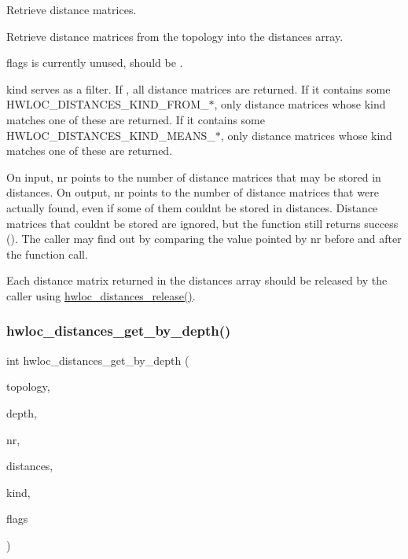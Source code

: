 Retrieve distance matrices. 

Retrieve distance matrices from the topology into the {\ttfamily distances} array.

{\ttfamily flags} is currently unused, should be {}.

{\ttfamily kind} serves as a filter. If {}, all distance matrices are returned. If it contains some H\+W\+L\+O\+C\+\_\+\+D\+I\+S\+T\+A\+N\+C\+E\+S\+\_\+\+K\+I\+N\+D\+\_\+\+F\+R\+O\+M\+\_\+$\ast$, only distance matrices whose kind matches one of these are returned. If it contains some H\+W\+L\+O\+C\+\_\+\+D\+I\+S\+T\+A\+N\+C\+E\+S\+\_\+\+K\+I\+N\+D\+\_\+\+M\+E\+A\+N\+S\+\_\+$\ast$, only distance matrices whose kind matches one of these are returned.

On input, {\ttfamily nr} points to the number of distance matrices that may be stored in {\ttfamily distances}. On output, {\ttfamily nr} points to the number of distance matrices that were actually found, even if some of them couldn\textquotesingle{}t be stored in {\ttfamily distances}. Distance matrices that couldn\textquotesingle{}t be stored are ignored, but the function still returns success ({}). The caller may find out by comparing the value pointed by {\ttfamily nr} before and after the function call.

Each distance matrix returned in the {\ttfamily distances} array should be released by the caller using \hyperlink{a00208_ga1dd78c1f9acd54f26aba0e284e97e51d}{hwloc\+\_\+distances\+\_\+release()}. \mbox{\label{a00208_ga5d1d35eccfcc2ebcef71a10972ce9b03}} 
\subsubsection{\texorpdfstring{hwloc\+\_\+distances\+\_\+get\+\_\+by\+\_\+depth()}{hwloc\_distances\_get\_by\_depth()}}
{\footnotesize\ttfamily int hwloc\+\_\+distances\+\_\+get\+\_\+by\+\_\+depth (\begin{DoxyParamCaption}\item[{\hyperlink{a00186_ga9d1e76ee15a7dee158b786c30b6a6e38}{hwloc\+\_\+topology\+\_\+t}}]{topology,  }\item[{int}]{depth,  }\item[{unsigned $\ast$}]{nr,  }\item[{struct \hyperlink{a00310}{hwloc\+\_\+distances\+\_\+s} $\ast$$\ast$}]{distances,  }\item[{unsigned long}]{kind,  }\item[{unsigned long}]{flags }\end{DoxyParamCaption})}



